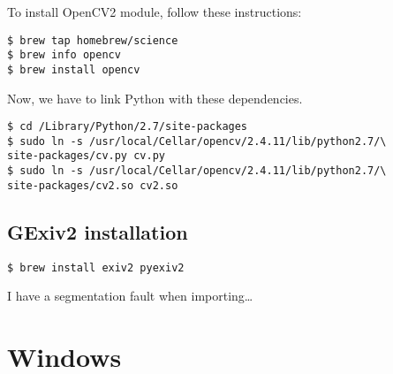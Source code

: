 \documentclass[a4paper, 11pt]{article}
\begin{document}
To install OpenCV2 module, follow these instructions:

\begin{verbatim}
$ brew tap homebrew/science
$ brew info opencv
$ brew install opencv
\end{verbatim}

Now, we have to link Python with these dependencies.

\begin{verbatim}
$ cd /Library/Python/2.7/site-packages
$ sudo ln -s /usr/local/Cellar/opencv/2.4.11/lib/python2.7/\
site-packages/cv.py cv.py
$ sudo ln -s /usr/local/Cellar/opencv/2.4.11/lib/python2.7/\
site-packages/cv2.so cv2.so
\end{verbatim}

\subsection*{GExiv2 installation}

\begin{verbatim}
$ brew install exiv2 pyexiv2
\end{verbatim}

I have a segmentation fault when importing\dots

\section{Windows}
\end{document}
